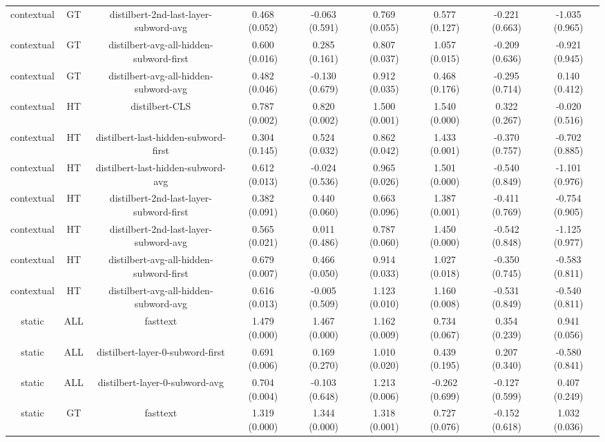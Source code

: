 \begin{sidewaystable}[htb]
\begin{tabular}{@{}ccccccccc@{}}
        contextual & GT & distilbert-2nd-last-layer-subword-avg & 0.468 (0.052) & -0.063 (0.591) & 0.769 (0.055) & 0.577 (0.127) & -0.221 (0.663) & -1.035 (0.965) \\
        contextual & GT & distilbert-avg-all-hidden-subword-first & 0.600 (0.016) & 0.285 (0.161) & 0.807 (0.037) & 1.057 (0.015) & -0.209 (0.636) & -0.921 (0.945) \\
        contextual & GT & distilbert-avg-all-hidden-subword-avg & 0.482 (0.046) & -0.130 (0.679) & 0.912 (0.035) & 0.468 (0.176) & -0.295 (0.714) & 0.140 (0.412) \\
        contextual & HT & distilbert-CLS & 0.787 (0.002) & 0.820 (0.002) & 1.500 (0.001) & 1.540 (0.000) & 0.322 (0.267) & -0.020 (0.516) \\
        contextual & HT & distilbert-last-hidden-subword-first & 0.304 (0.145) & 0.524 (0.032) & 0.862 (0.042) & 1.433 (0.001) & -0.370 (0.757) & -0.702 (0.885) \\
        contextual & HT & distilbert-last-hidden-subword-avg & 0.612 (0.013) & -0.024 (0.536) & 0.965 (0.026) & 1.501 (0.000) & -0.540 (0.849) & -1.101 (0.976) \\
        contextual & HT & distilbert-2nd-last-layer-subword-first & 0.382 (0.091) & 0.440 (0.060) & 0.663 (0.096) & 1.387 (0.001) & -0.411 (0.769) & -0.754 (0.905) \\
        contextual & HT & distilbert-2nd-last-layer-subword-avg & 0.565 (0.021) & 0.011 (0.486) & 0.787 (0.060) & 1.450 (0.000) & -0.542 (0.848) & -1.125 (0.977) \\
        contextual & HT & distilbert-avg-all-hidden-subword-first & 0.679 (0.007) & 0.466 (0.050) & 0.914 (0.033) & 1.027 (0.018) & -0.350 (0.745) & -0.583 (0.811) \\
        contextual & HT & distilbert-avg-all-hidden-subword-avg & 0.616 (0.013) & -0.005 (0.509) & 1.123 (0.010) & 1.160 (0.008) & -0.531 (0.849) & -0.540 (0.811) \\
        static & ALL & fasttext & 1.479 (0.000) & 1.467 (0.000) & 1.162 (0.009) & 0.734 (0.067) & 0.354 (0.239) & 0.941 (0.056) \\
        static & ALL & distilbert-layer-0-subword-first & 0.691 (0.006) & 0.169 (0.270) & 1.010 (0.020) & 0.439 (0.195) & 0.207 (0.340) & -0.580 (0.841) \\
        static & ALL & distilbert-layer-0-subword-avg & 0.704 (0.004) & -0.103 (0.648) & 1.213 (0.006) & -0.262 (0.699) & -0.127 (0.599) & 0.407 (0.249) \\
        static & GT & fasttext & 1.319 (0.000) & 1.344 (0.000) & 1.318 (0.001) & 0.727 (0.076) & -0.152 (0.618) & 1.032 (0.036) \\

\end{tabular}
\end{sidewaystable}
